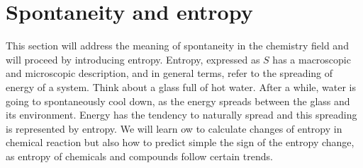 \documentclass[main.tex]{subfiles}
\begin{document}
\section{Spontaneity and entropy}
This section will address the meaning of spontaneity in the chemistry field and will proceed by introducing entropy. Entropy, expressed as $S$ has a macroscopic and microscopic description, and in general terms, refer to the spreading of energy of a system. Think about a glass full of hot water. After a while, water is going to spontaneously cool down, as the energy spreads between the glass and its environment. Energy has the tendency to naturally spread and this spreading is represented by entropy. We will learn ow to calculate changes of entropy in chemical reaction but also how to predict simple the sign of the entropy change, as entropy of chemicals and compounds follow certain trends.
\sloppy
\end{document}
